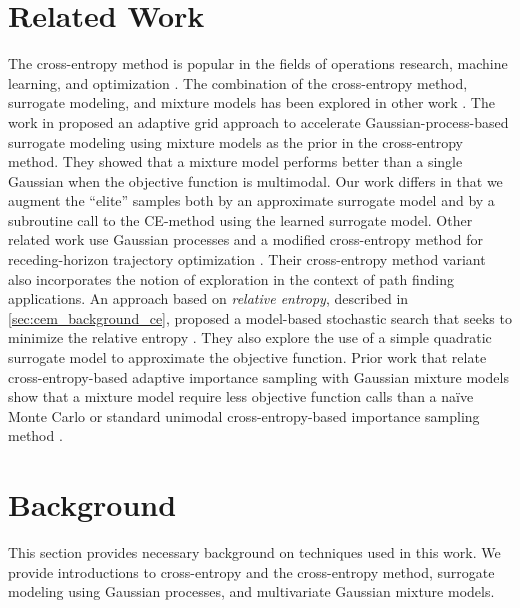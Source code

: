 \section{Related Work} \label{sec:cem_related_work}
The cross-entropy method is popular in the fields of operations research, machine learning, and optimization \cite{kochenderfer2015decision,Kochenderfer2019}.
The combination of the cross-entropy method, surrogate modeling, and mixture models has been explored in other work \cite{bardenet2010surrogating}. 
The work in \cite{bardenet2010surrogating} proposed an adaptive grid approach to accelerate Gaussian-process-based surrogate modeling using mixture models as the prior in the cross-entropy method. They showed that a mixture model performs better than a single Gaussian when the objective function is multimodal.
Our work differs in that we augment the ``elite'' samples both by an approximate surrogate model and by a subroutine call to the CE-method using the learned surrogate model.
Other related work use Gaussian processes and a modified cross-entropy method for receding-horizon trajectory optimization \cite{tan2018gaussian}.
Their cross-entropy method variant also incorporates the notion of exploration in the context of path finding applications.
An approach based on \textit{relative entropy}, described in \cref{sec:cem_background_ce}, proposed a model-based stochastic search that seeks to minimize the relative entropy \cite{NIPS2015_5672}. They also explore the use of a simple quadratic surrogate model to approximate the objective function.
Prior work that relate cross-entropy-based adaptive importance sampling with Gaussian mixture models show that a mixture model require less objective function calls than a na\"ive Monte Carlo or standard unimodal cross-entropy-based importance sampling method \cite{kurtz2013cross,wang2016cross}.


\section{Background} \label{sec:cem_background}
This section provides necessary background on techniques used in this work. We provide introductions to cross-entropy and the cross-entropy method, surrogate modeling using Gaussian processes, and multivariate Gaussian mixture models.

